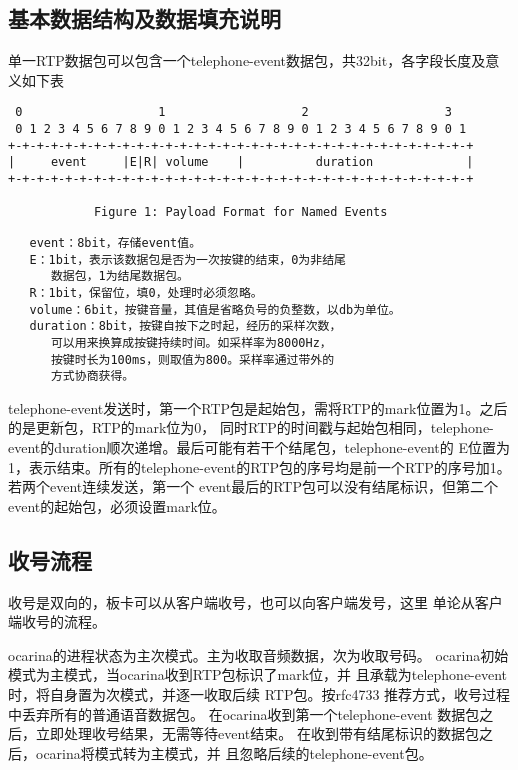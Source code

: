\documentclass[11pt]{article}
\begin{document}
\subsection{基本数据结构及数据填充说明}
   单一RTP数据包可以包含一个telephone-event数据包，共32bit，各字段长度及意义如下表
{  \small
\begin{verbatim}
 0                   1                   2                   3
 0 1 2 3 4 5 6 7 8 9 0 1 2 3 4 5 6 7 8 9 0 1 2 3 4 5 6 7 8 9 0 1
+-+-+-+-+-+-+-+-+-+-+-+-+-+-+-+-+-+-+-+-+-+-+-+-+-+-+-+-+-+-+-+-+
|     event     |E|R| volume    |          duration             |
+-+-+-+-+-+-+-+-+-+-+-+-+-+-+-+-+-+-+-+-+-+-+-+-+-+-+-+-+-+-+-+-+

            Figure 1: Payload Format for Named Events
\end{verbatim}
}
\begin{verbatim}
   event：8bit，存储event值。
   E：1bit，表示该数据包是否为一次按键的结束，0为非结尾
      数据包，1为结尾数据包。
   R：1bit，保留位，填0，处理时必须忽略。
   volume：6bit，按键音量，其值是省略负号的负整数，以db为单位。
   duration：8bit，按键自按下之时起，经历的采样次数，
      可以用来换算成按键持续时间。如采样率为8000Hz，
      按键时长为100ms，则取值为800。采样率通过带外的
      方式协商获得。
\end{verbatim}

   telephone-event发送时，第一个RTP包是起始包，需将RTP的mark位置为1。之后的是更新包，RTP的mark位为0，
同时RTP的时间戳与起始包相同，telephone-event的duration顺次递增。最后可能有若干个结尾包，telephone-event的
E位置为1，表示结束。所有的telephone-event的RTP包的序号均是前一个RTP的序号加1。若两个event连续发送，第一个
event最后的RTP包可以没有结尾标识，但第二个event的起始包，必须设置mark位。

\subsection{收号流程}
    收号是双向的，板卡可以从客户端收号，也可以向客户端发号，这里
单论从客户端收号的流程。

    ocarina的进程状态为主次模式。主为收取音频数据，次为收取号码。
    ocarina初始模式为主模式，当ocarina收到RTP包标识了mark位，并
且承载为telephone-event时，将自身置为次模式，并逐一收取后续
RTP包。按rfc4733 推荐方式，收号过程中丢弃所有的普通语音数据包。
在ocarina收到第一个telephone-event
数据包之后，立即处理收号结果，无需等待event结束。
在收到带有结尾标识的数据包之后，ocarina将模式转为主模式，并
且忽略后续的telephone-event包。
\end{document}
